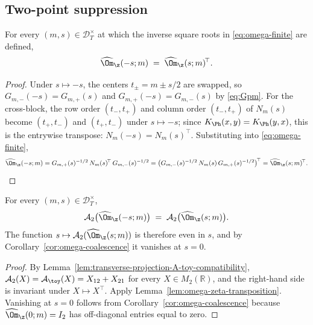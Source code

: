 \subsection{Two-point suppression}
\label{subsec:two-point-suppression}

\begin{lemma}
\label{lem:omega-zeta-transposition}
For every \((m,s)\in\mathcal D_T^\times\) at which the inverse square
roots in \eqref{eq:omega-finite} are defined,
\begin{equation}
\label{eq:omega-zeta-transposition}
        \widehat\Om_\z(-s;m) \;=\; \widehat\Om_\z(s;m)^{\!\top}.
\end{equation}
\end{lemma}

\begin{proof}
Under \(s\mapsto -s\), the centers \(t_\pm=m\pm s/2\) are swapped, so
\(G_{m,-}(-s)=G_{m,+}(s)\) and \(G_{m,+}(-s)=G_{m,-}(s)\) by
\eqref{eq:Gpm}.  For the cross-block, the row order \((t_-,t_+)\) and
column order \((t_-,t_+)\) of \(N_m(s)\) become \((t_+,t_-)\) and
\((t_+,t_-)\) under \(s\mapsto-s\); since \(K_\Ph(x,y)=K_\Ph(y,x)\),
this is the entrywise transpose:
\(N_m(-s)=N_m(s)^{\!\top}\).  Substituting into \eqref{eq:omega-finite},
\[
        \widehat\Om_\z(-s;m)
        = G_{m,+}(s)^{-1/2}\,N_m(s)^{\!\top}\,G_{m,-}(s)^{-1/2}
        = \bigl(G_{m,-}(s)^{-1/2}\,N_m(s)\,G_{m,+}(s)^{-1/2}\bigr)^{\!\top}
        = \widehat\Om_\z(s;m)^{\!\top}.
        \qedhere
\]
\end{proof}

\begin{corollary}
\label{cor:A2-omega-zeta-parity}
For every \((m,s)\in\mathcal D_T^\times\),
\begin{equation}
\label{eq:A2-omega-zeta-parity}
        \mathcal A_2\bigl(\widehat\Om_\z(-s;m)\bigr)
        \;=\;\mathcal A_2\bigl(\widehat\Om_\z(s;m)\bigr).
\end{equation}
The function \(s\mapsto \mathcal A_2(\widehat\Om_\z(s;m))\) is therefore
even in \(s\), and by Corollary~\ref{cor:omega-coalescence} it vanishes
at \(s=0\).
\end{corollary}

\begin{proof}
By Lemma~\ref{lem:transverse-projection-A-toy-compatibility},
\(\mathcal A_2(X)=\mathcal A_\toy(X)=X_{12}+X_{21}\) for every
\(X\in M_2(\mathbb R)\), and the right-hand side is invariant under
\(X\mapsto X^{\!\top}\).  Apply
Lemma~\ref{lem:omega-zeta-transposition}.  Vanishing at \(s=0\)
follows from Corollary~\ref{cor:omega-coalescence} because
\(\widehat\Om_\z(0;m)=I_2\) has off-diagonal entries equal to zero.
\end{proof}

